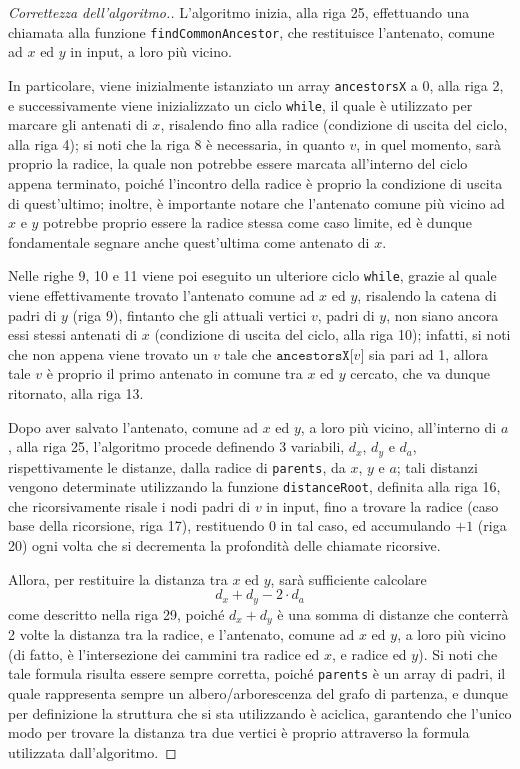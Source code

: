 \documentclass[a4paper, 12pt]{report}
\begin{document}
    \begin{proof}[Correttezza dell'algoritmo.]
        L'algoritmo inizia, alla riga 25, effettuando una chiamata alla funzione \texttt{findCommonAncestor}, che restituisce l'antenato, comune ad $x$ ed $y$ in input, a loro più vicino.

        In particolare, viene inizialmente istanziato un array \texttt{ancestorsX} a 0, alla riga 2, e successivamente viene inizializzato un ciclo \texttt{while}, il quale è utilizzato per marcare gli antenati di $x$, risalendo fino alla radice (condizione di uscita del ciclo, alla riga 4); si noti che la riga 8 è necessaria, in quanto $v$, in quel momento, sarà proprio la radice, la quale non potrebbe essere marcata all'interno del ciclo appena terminato, poiché l'incontro della radice è proprio la condizione di uscita di quest'ultimo; inoltre, è importante notare che l'antenato comune più vicino ad $x$ e $y$ potrebbe proprio essere la radice stessa come caso limite, ed è dunque fondamentale segnare anche quest'ultima come antenato di $x$.

        Nelle righe 9, 10 e 11 viene poi eseguito un ulteriore ciclo \texttt{while}, grazie al quale viene effettivamente trovato l'antenato comune ad $x$ ed $y$, risalendo la catena di padri di $y$ (riga 9), fintanto che gli attuali vertici $v$, padri di $y$, non siano ancora essi stessi antenati di $x$ (condizione di uscita del ciclo, alla riga 10); infatti, si noti che non appena viene trovato un $v$ tale che $\texttt{ancestorsX[}v\texttt{]}$ sia pari ad 1, allora tale $v$ è proprio il primo antenato in comune tra $x$ ed $y$ cercato, che va dunque ritornato, alla riga 13.

        Dopo aver salvato l'antenato, comune ad $x$ ed $y$, a loro più vicino, all'interno di $a$, alla riga 25, l'algoritmo procede definendo 3 variabili, $d_x$, $d_y$ e $d_a$, rispettivamente le distanze, dalla radice di \texttt{parents}, da $x$, $y$ e $a$; tali distanzi vengono determinate utilizzando la funzione \texttt{distanceRoot}, definita alla riga 16, che ricorsivamente risale i nodi padri di $v$ in input, fino a trovare la radice (caso base della ricorsione, riga 17), restituendo 0 in tal caso, ed accumulando $+1$ (riga 20) ogni volta che si decrementa la profondità delle chiamate ricorsive.

        Allora, per restituire la distanza tra $x$ ed $y$, sarà sufficiente calcolare $$d_x + d_y - 2 \cdot d_a$$ come descritto nella riga 29, poiché $d_x + d_y$ è una somma di distanze che conterrà 2 volte la distanza tra la radice, e l'antenato, comune ad $x$ ed $y$, a loro più vicino (di fatto, è l'intersezione dei cammini tra radice ed $x$, e radice ed $y$). Si noti che tale formula risulta essere sempre corretta, poiché \texttt{parents} è un array di padri, il quale rappresenta sempre un albero/arborescenza del grafo di partenza, e dunque per definizione la struttura che si sta utilizzando è aciclica, garantendo che l'unico modo per trovare la distanza tra due vertici è proprio attraverso la formula utilizzata dall'algoritmo.
    \end{proof}
\end{document}
